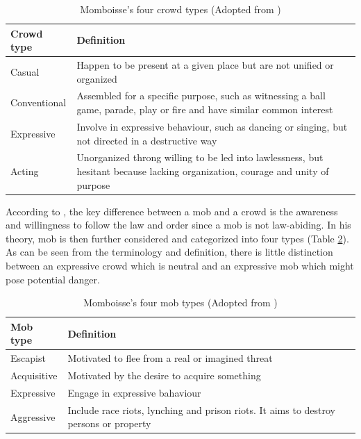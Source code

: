\begin{table}[!htbp]
	\caption{Momboisse's four crowd types (Adopted from \citet{Schweingruber2000})}
	\label{table:momboisseCrowdType}
	\centering
	\begin{tabular}{|l|p{10cm}|}
		\hline
		\textbf{Crowd type} & \textbf{Definition} \\ \hline \hline
		Casual & Happen to be present at a given place but are not unified or organized \\ \hline
		Conventional & Assembled for a specific purpose, such as witnessing a ball game, parade, play or fire 
		and have similar common interest \\ \hline
		Expressive & Involve in expressive behaviour, such as dancing or singing, but not directed in a destructive way \\ \hline
		Acting & Unorganized throng willing to be led into lawlessness, but hesitant because lacking organization, courage and unity of purpose \\ \hline
	\end{tabular}
\end{table}


According to \citet{Momboisse1967}, the key difference between a mob and a crowd is the awareness and willingness to follow the law and order since a mob is not law-abiding. In his theory, mob is then further considered and categorized into four types (Table \ref{table:momboisseMobType}). As can be seen from the terminology and definition, there is little distinction between an expressive crowd which is neutral and an expressive mob which might pose potential danger.

\begin{table}
	\caption{Momboisse's four mob types (Adopted from \citet{Schweingruber2000})}
	\label{table:momboisseMobType}
	\centering
	\begin{tabular}{|l|p{10cm}|}
		\hline
		\textbf{Mob type} & \textbf{Definition} \\ \hline \hline
		Escapist & Motivated to flee from a real or imagined threat \\ \hline
		Acquisitive &  Motivated by the desire to acquire something \\ \hline
		Expressive & Engage in expressive bahaviour \\ \hline
		Aggressive & Include race riots, lynching and prison riots. It aims to destroy persons or property \\ \hline
	\end{tabular}
\end{table}


